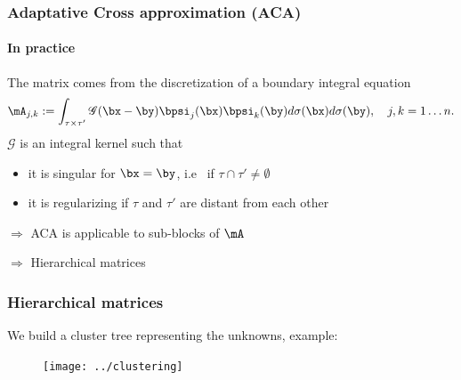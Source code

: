 
\begin{frame}
\frametitle{Adaptative Cross approximation (ACA)}
\framesubtitle{In practice} 
The matrix comes from the discretization of a boundary integral equation 
\begin{equation*}\label{GalerkinMatrix}
\mA_{j,k}:= \int_{\tau\times\tau'}\mathscr{G}(\bx-\by) \bpsi_{j}(\bx)\bpsi_{k}(\by) d\sigma(\bx) d\sigma(\by),\quad j,k = 1\dots n.
\end{equation*}
$\mathscr{G}$ is an integral kernel such that 
\begin{itemize}
\item it is singular for $\bx = \by$, i.e~ if $\tau \cap \tau' \ne \emptyset$
\item it is regularizing if $\tau$ and $\tau'$ are distant from each other 
\end{itemize}
\bigskip

 $\Rightarrow$ ACA is applicable to sub-blocks of $\mA$ 
 
 $\Rightarrow$ Hierarchical matrices
\end{frame}


\begin{frame}
\frametitle{Hierarchical matrices}
We build a cluster tree representing the unknowns, example:
\begin{figure}
	\centering
	\texttt{[image: ../clustering]}
	
	
\end{figure}


\end{frame}








